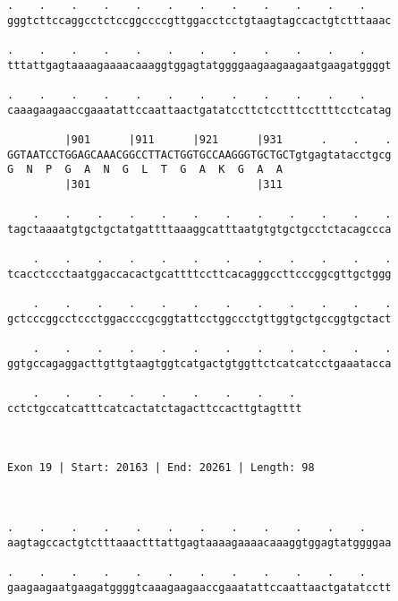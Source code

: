 \documentclass{article}
\begin{document}
\begin{Verbatim}
.    .    .    .    .    .    .    .    .    .    .    .    
gggtcttccaggcctctccggccccgttggacctcctgtaagtagccactgtctttaaac
                                                            
.    .    .    .    .    .    .    .    .    .    .    .    
tttattgagtaaaagaaaacaaaggtggagtatggggaagaagaagaatgaagatggggt
                                                            
.    .    .    .    .    .    .    .    .    .    .    .    
caaagaagaaccgaaatattccaattaactgatatccttctcctttccttttcctcatag
                                                            
         |901      |911      |921      |931      .    .    .
GGTAATCCTGGAGCAAACGGCCTTACTGGTGCCAAGGGTGCTGCTgtgagtatacctgcg
G  N  P  G  A  N  G  L  T  G  A  K  G  A  A                 
         |301                          |311                 
  
    .    .    .    .    .    .    .    .    .    .    .    .
tagctaaaatgtgctgctatgattttaaaggcatttaatgtgtgctgcctctacagccca
                                                            
    .    .    .    .    .    .    .    .    .    .    .    .
tcacctccctaatggaccacactgcattttccttcacagggccttcccggcgttgctggg
                                                            
    .    .    .    .    .    .    .    .    .    .    .    .
gctcccggcctccctggaccccgcggtattcctggccctgttggtgctgccggtgctact
                                                            
    .    .    .    .    .    .    .    .    .    .    .    .
ggtgccagaggacttgttgtaagtggtcatgactgtggttctcatcatcctgaaatacca
                                                            
    .    .    .    .    .    .    .    .    . 
cctctgccatcatttcatcactatctagacttccacttgtagtttt
                                              
                                              
 
Exon 19 | Start: 20163 | End: 20261 | Length: 98



.    .    .    .    .    .    .    .    .    .    .    .    
aagtagccactgtctttaaactttattgagtaaaagaaaacaaaggtggagtatggggaa
                                                            
.    .    .    .    .    .    .    .    .    .    .    .    
gaagaagaatgaagatggggtcaaagaagaaccgaaatattccaattaactgatatcctt
                                                            

\end{Verbatim}
\end{document}

